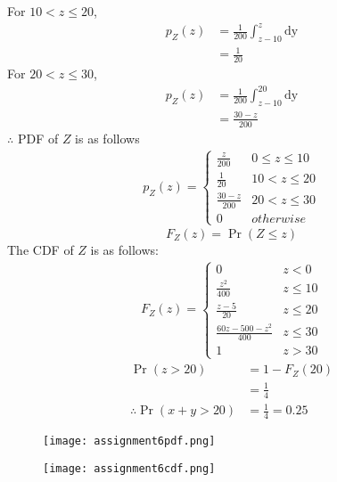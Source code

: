 \documentclass[journal,12pt,twocolumn]{IEEEtran}
\begin{document}
For $ 10 < z \leq 20 $,
\begin{align}
p_Z(z) &= \frac{1}{200}  \int_{z-10}^{z}\mathrm{dy}  \\
        &= \frac{1}{20} \label{8}
\end{align}
For $ 20 < z \leq 30 $,
\begin{align}
p_Z(z) &=\frac{1}{200}  \int_{z-10}^{20}\mathrm{dy}  \\
       &= \frac{30-z}{200} \label{9}
\end{align}
$\therefore$ PDF of $Z$ is as follows
\begin{align}
p_{Z}(z)  = 
\begin{cases}
  \frac{z}{200}& 0 \leq z \leq 10 \\
  \frac{1}{20} & 10 < z \leq 20 \\
  \frac{30-z}{200} & 20 < z \leq 30 \\
  0 & otherwise \label{10}
\end{cases}
\end{align}
\begin{equation}
F_Z(z) = \Pr(Z \leq z) \label{cdf}
\end{equation}
The CDF  of $Z$ is as follows:
\begin{align}
F_Z(z)  = 
\begin{cases}
0 & z < 0 \\
  \frac{z^2}{400} &  z \leq 10 \\
  \frac{z-5}{20} &  z \leq 20 \\
  \frac{60z -500 -z^2}{400} & z \leq 30 \\
  1 & z > 30 \label{11}
\end{cases}
\end{align}
\begin{align}
\Pr(z > 20)&= 1- F_Z(20) \\
           &=\frac{1}{4} \label{12} \\
\therefore \Pr(x+y>20)&=\frac{1}{4}=0.25
\end{align}
\begin{figure}[htb!]
\begin{center}
\texttt{[image: assignment6pdf.png]}
\end{center}
\end{figure}

\begin{figure}[htb!]
\begin{center}
\texttt{[image: assignment6cdf.png]}
\end{center}
\end{figure}
\end{document}
